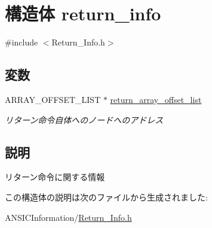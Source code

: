 \section{構造体 return\_\-info}
\label{structreturn__info}


{\ttfamily \#include $<$Return\_\-Info.h$>$}

\subsection*{変数}
\begin{DoxyCompactItemize}
\item 
ARRAY\_\-OFFSET\_\-LIST $\ast$ \hyperlink{structreturn__info_a4a73b7eb55cc8db61c9175f7f0d98a40}{return\_\-array\_\-offset\_\-list}\label{structreturn__info_a4a73b7eb55cc8db61c9175f7f0d98a40}

\begin{DoxyCompactList}\small\item\em リターン命令自体へのノードへのアドレス \item\end{DoxyCompactList}\end{DoxyCompactItemize}


\subsection{説明}
リターン命令に関する情報 

この構造体の説明は次のファイルから生成されました:\begin{DoxyCompactItemize}
\item 
ANSICInformation/\hyperlink{Return__Info_8h}{Return\_\-Info.h}\end{DoxyCompactItemize}
